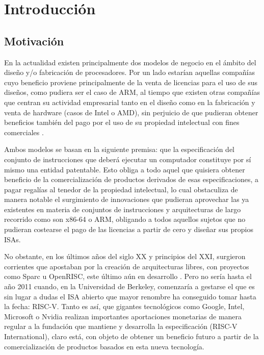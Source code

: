\chapter{Introducción}


\section{Motivación}

En la actualidad existen principalmente dos modelos de negocio en el ámbito del diseño y/o fabricación de procesadores. Por un lado estarían aquellas compañías cuyo beneficio proviene principalmente de la venta de licencias para el uso de sus diseños, como pudiera ser el caso de ARM, al tiempo que existen otras compañías que centran su actividad empresarial tanto en el diseño como en la fabricación y venta de hardware (casos de Intel o AMD), sin perjuicio de que pudieran obtener beneficios también del pago por el uso de su propiedad intelectual con fines comerciales \cite{asanovic2014instruction}.

Ambos modelos se basan en la siguiente premisa: que la especificación del conjunto de instrucciones que deberá ejecutar un computador constituye por sí mismo una entidad patentable. Esto obliga a todo aquel que quisiera obtener beneficio de la comercialización de productos derivados de esas especificaciones, a pagar regalías al tenedor de la propiedad intelectual, lo cual obstaculiza de manera notable el surgimiento de innovaciones que pudieran aprovechar las ya existentes en materia de conjuntos de instrucciones y arquitecturas de largo recorrido como son x86-64 o ARM, obligando a todos aquellos sujetos que no pudieran costearse el pago de las licencias a partir de cero y diseñar sus propios ISAs.

No obstante, en los últimos años del siglo XX y principios del XXI, surgieron corrientes que apostaban por la creación de arquitecturas libres, con proyectos como Sparc u OpenRISC, este último aún en desarrollo \cite{openrisc}. Pero no sería hasta el año 2011 \cite{geneology} cuando, en la Universidad de Berkeley, comenzaría a gestarse el que es sin lugar a dudas el ISA abierto que mayor renombre ha conseguido tomar hasta la fecha: RISC-V. Tanto es así, que gigantes tecnológicos como Google, Intel, Microsoft o Nvidia \cite{partners} realizan importantes aportaciones monetarias de manera regular a la fundación que mantiene y desarrolla la especificación (RISC-V International), claro está, con objeto de obtener un beneficio futuro a partir de la comercialización de productos basados en esta nueva tecnología.

